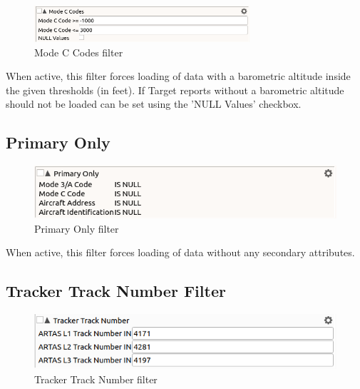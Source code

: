 \begin{figure}[H]
  \center
    \includegraphics[width=8cm,frame]{figures/filter_modec.png}
  \caption{Mode C Codes filter}
\end{figure}

When active, this filter forces loading of data with a barometric altitude inside the given thresholds (in feet). If Target reports without a barometric altitude should not be loaded can be set using the 'NULL Values' checkbox.

\subsection{Primary Only}

\begin{figure}[H]
  \center
    \includegraphics[width=12cm,frame]{figures/filter_primary_only.png}
  \caption{Primary Only filter}
\end{figure}

When active, this filter forces loading of data without any secondary attributes.

% 
% 
% 
% 
\subsection{Tracker Track Number Filter}

\begin{figure}[H]
  \center
    \includegraphics[width=12cm,frame]{figures/filter_trackertracknum.png}
  \caption{Tracker Track Number filter}
\end{figure}

